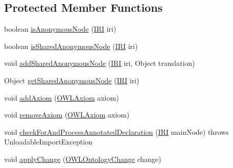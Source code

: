 \subsection*{Protected Member Functions}
\begin{DoxyCompactItemize}
\item 
boolean \hyperlink{classorg_1_1coode_1_1owlapi_1_1rdfxml_1_1parser_1_1_o_w_l_r_d_f_consumer_adbec42a6c9fcb31ad7fc98fc446c1af3}{is\-Anonymous\-Node} (\hyperlink{classorg_1_1semanticweb_1_1owlapi_1_1model_1_1_i_r_i}{I\-R\-I} iri)
\item 
boolean \hyperlink{classorg_1_1coode_1_1owlapi_1_1rdfxml_1_1parser_1_1_o_w_l_r_d_f_consumer_a180b8518500094194003ec5c81b84fab}{is\-Shared\-Anonymous\-Node} (\hyperlink{classorg_1_1semanticweb_1_1owlapi_1_1model_1_1_i_r_i}{I\-R\-I} iri)
\item 
void \hyperlink{classorg_1_1coode_1_1owlapi_1_1rdfxml_1_1parser_1_1_o_w_l_r_d_f_consumer_a4af2420aa6133b502d502322feed715a}{add\-Shared\-Anonymous\-Node} (\hyperlink{classorg_1_1semanticweb_1_1owlapi_1_1model_1_1_i_r_i}{I\-R\-I} iri, Object translation)
\item 
Object \hyperlink{classorg_1_1coode_1_1owlapi_1_1rdfxml_1_1parser_1_1_o_w_l_r_d_f_consumer_ad3614488f9a94cf9efe97064f54de4e2}{get\-Shared\-Anonymous\-Node} (\hyperlink{classorg_1_1semanticweb_1_1owlapi_1_1model_1_1_i_r_i}{I\-R\-I} iri)
\item 
void \hyperlink{classorg_1_1coode_1_1owlapi_1_1rdfxml_1_1parser_1_1_o_w_l_r_d_f_consumer_af2aea851acd86a0f7ed876ad9f8108e8}{add\-Axiom} (\hyperlink{interfaceorg_1_1semanticweb_1_1owlapi_1_1model_1_1_o_w_l_axiom}{O\-W\-L\-Axiom} axiom)
\item 
void \hyperlink{classorg_1_1coode_1_1owlapi_1_1rdfxml_1_1parser_1_1_o_w_l_r_d_f_consumer_a2f4493ff7f2417ef864e56bd0ce4f9f5}{remove\-Axiom} (\hyperlink{interfaceorg_1_1semanticweb_1_1owlapi_1_1model_1_1_o_w_l_axiom}{O\-W\-L\-Axiom} axiom)
\item 
void \hyperlink{classorg_1_1coode_1_1owlapi_1_1rdfxml_1_1parser_1_1_o_w_l_r_d_f_consumer_a25b92f3a008d7738c6c3b972d29ebcfb}{check\-For\-And\-Process\-Annotated\-Declaration} (\hyperlink{classorg_1_1semanticweb_1_1owlapi_1_1model_1_1_i_r_i}{I\-R\-I} main\-Node)  throws Unloadable\-Import\-Exception 
\item 
void \hyperlink{classorg_1_1coode_1_1owlapi_1_1rdfxml_1_1parser_1_1_o_w_l_r_d_f_consumer_a7034f16606bf00c7bc5771b0ac778037}{apply\-Change} (\hyperlink{classorg_1_1semanticweb_1_1owlapi_1_1model_1_1_o_w_l_ontology_change}{O\-W\-L\-Ontology\-Change} change)

\end{DoxyCompactItemize}
